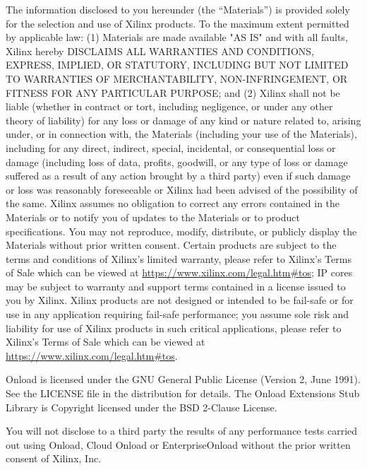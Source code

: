 
The information disclosed to you hereunder (the “Materials”) is provided 
solely for the selection and use of Xilinx products. To the maximum extent 
permitted by applicable law: (1) Materials are made available "AS IS" and 
with all faults, Xilinx hereby DISCLAIMS ALL WARRANTIES AND CONDITIONS, 
EXPRESS, IMPLIED, OR STATUTORY, INCLUDING BUT NOT LIMITED TO WARRANTIES OF 
MERCHANTABILITY, NON-INFRINGEMENT, OR FITNESS FOR ANY PARTICULAR PURPOSE; and 
(2) Xilinx shall not be liable (whether in contract or tort, including 
negligence, or under any other theory of liability) for any loss or damage of 
any kind or nature related to, arising under, or in connection with, the 
Materials (including your use of the Materials), including for any direct, 
indirect, special, incidental, or consequential loss or damage (including 
loss of data, profits, goodwill, or any type of loss or damage suffered as a 
result of any action brought by a third party) even if such damage or loss 
was reasonably foreseeable or Xilinx had been advised of the possibility of 
the same. Xilinx assumes no obligation to correct any errors contained in the 
Materials or to notify you of updates to the Materials or to product 
specifications. You may not reproduce, modify, distribute, or publicly 
display the Materials without prior written consent. Certain products are 
subject to the terms and conditions of Xilinx’s limited warranty, please 
refer to Xilinx’s Terms of Sale which can be viewed at 
\href{https://www.xilinx.com/legal.htm\#tos}{https://www.xilinx.com/legal.htm\#tos}; 
IP cores may be subject to warranty and support terms contained in a license 
issued to you by Xilinx. Xilinx products are not designed or intended to be 
fail-safe or for use in any application requiring fail-safe performance; you 
assume sole risk and liability for use of Xilinx products in such critical 
applications, please refer to Xilinx’s Terms of Sale which can be viewed at 
\href{https://www.xilinx.com/legal.htm\#tos}{https://www.xilinx.com/legal.htm\#tos}.

Onload is licensed under the GNU General Public License (Version 2, June
1991). See the LICENSE file in the distribution for details. The Onload
Extensions Stub Library is Copyright licensed under the BSD 2-Clause
License.

You will not disclose to a third party the results of any performance
tests carried out using Onload, Cloud Onload  or EnterpriseOnload without the 
prior written consent of Xilinx, Inc.

